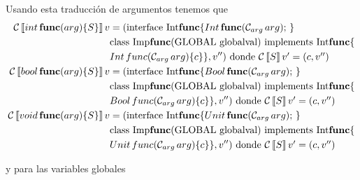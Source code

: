 Usando esta traducción de argumentos tenemos que
\begin{align*}
  \mathcal{C}\left\llbracket int\,\textbf{func}(arg)\{S\} \right\rrbracket v &= (\mbox{interface Int$\textbf{func}$}\{
  \mbox{$Int\, \textbf{func}(\mathcal{C}_{arg}\,arg)\mbox{; }$}\}\\
  & \mbox{class Imp$\textbf{func}($GLOBAL globalval$)$ implements Int$\textbf{func}\{$}\\
  & Int\, func(\mathcal{C}_{arg}\,arg) \{ c \}\} , v'')
  \mbox{ donde $\mathcal{C}\left\llbracket S \right\rrbracket v' = (c, v'')$} \\
  \mathcal{C}\left\llbracket bool\,\textbf{func}(arg)\{S\} \right\rrbracket v &= (\mbox{interface Int$\textbf{func}$}\{
  \mbox{$Bool\, \textbf{func}(\mathcal{C}_{arg}\,arg)\mbox{; }$}\}\\
  & \mbox{class Imp$\textbf{func}($GLOBAL globalval$)$ implements Int$\textbf{func}\{$}\\
  & Bool\, func(\mathcal{C}_{arg}\,arg) \{ c \}\} , v'')
  \mbox{ donde $\mathcal{C}\left\llbracket S \right\rrbracket v' = (c, v'')$} \\
  \mathcal{C}\left\llbracket void\,\textbf{func}(arg)\{S\} \right\rrbracket v &= (\mbox{interface Int$\textbf{func}$}\{
  \mbox{$Unit\, \textbf{func}(\mathcal{C}_{arg}\,arg)\mbox{; }$}\}\\
  & \mbox{class Imp$\textbf{func}($GLOBAL globalval$)$ implements Int$\textbf{func}\{$}\\
  & Unit\, func(\mathcal{C}_{arg}\,arg) \{ c \}\} , v'')
  \mbox{ donde $\mathcal{C}\left\llbracket S \right\rrbracket v' = (c, v'')$}
\end{align*}

y para las variables globales
